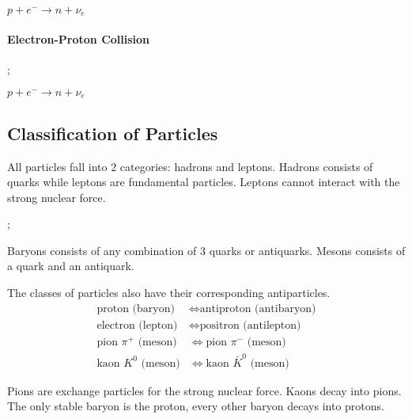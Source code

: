 \documentclass[10pt]{article}
\begin{document}
\begin{multicols*}{2}
\begin{center}
		$p + e^- \longrightarrow n + \nu_e$
	\end{center}

	\paragraph{Electron-Proton Collision}
	\begin{center}
		;

		$p + e^- \longrightarrow n + \nu_e$
	\end{center}

	\subsection{Classification of Particles}
	All particles fall into 2 categories: hadrons and leptons. Hadrons consists of
	quarks while leptons are fundamental particles. Leptons cannot interact with the
	strong nuclear force.

	\begin{center}
		;
	\end{center}

	Baryons consists of any combination of 3 quarks or antiquarks. Mesons consists
	of a quark and an antiquark.
	\medskip

	The classes of particles also have their corresponding antiparticles.
	\begin{align*}
		\text{proton (baryon)}      & \Leftrightarrow \text{antiproton (antibaryon)}  \\
		\text{electron (lepton)}    & \Leftrightarrow \text{positron (antilepton)}    \\
		\text{pion $\pi^+$ (meson)} & \Leftrightarrow \text{pion $\pi^-$ (meson)}     \\
		\text{kaon $K^0$ (meson)}   & \Leftrightarrow \text{kaon $\bar{K}^0$ (meson)}
	\end{align*}

	Pions are exchange particles for the strong nuclear force. Kaons decay into
	pions. The only stable baryon is the proton, every other baryon decays into
	protons.
	\medskip


\end{multicols*}
\end{document}
